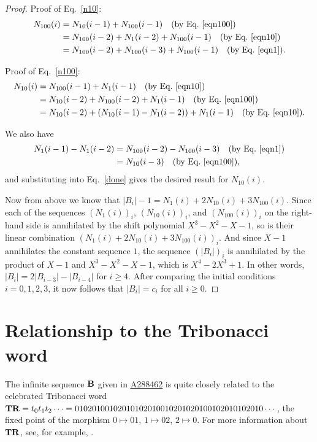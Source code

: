 \documentclass[
final
]{dmtcs-episciences}
\newcommand{\seqnum}[1]{\href{https://oeis.org/#1}{\rm \underline{#1}}}
\theoremstyle{plain}
\theoremstyle{definition}
\theoremstyle{remark}
\begin{document}
\begin{proof}
Proof of Eq.~\eqref{n10}:
\begin{align*}
N_{100} (i) &= N_{10} (i-1) + N_{100} (i-1) \quad \text{(by Eq.~\eqref{eqn100})} \\
&= N_{100} (i-2) + N_1 (i-2) + N_{100} (i-1) \quad \text{(by Eq.~\eqref{eqn10})} \\
&= N_{100} (i-2) + N_{100} (i-3) + N_{100} (i-1) \quad \text{(by Eq.~\eqref{eqn1})}.
\end{align*}

Proof of Eq.~\eqref{n100}:
\begin{align}
N_{10} (i) &= N_{100} (i-1) + N_1 (i-1) \quad \text{(by Eq.~\eqref{eqn10})}  \nonumber\\
&= N_{10} (i-2) + N_{100} (i-2) + N_1(i-1) \quad \text{(by Eq.~\eqref{eqn100})} \nonumber \\
&= N_{10} (i-2) + (N_{10} (i-1) - N_1 (i-2)) + N_1 (i-1) \quad \text{(by Eq.~\eqref{eqn10})} \label{done} .
\end{align}

We also have
\begin{align*}
N_1(i-1) - N_1 (i-2) &= N_{100} (i-2) - N_{100} (i-3) \quad \text{(by Eq.~\eqref{eqn1})} \\
&= N_{10} (i-3) \quad \text{(by Eq.~\eqref{eqn100})},
\end{align*}
and substituting into Eq.~\eqref{done} gives the desired result for $N_{10} (i)$.

Now from above we know that $|B_i| - 1 = N_1 (i) + 2 N_{10} (i) + 3 N_{100} (i)$.  Since each of the
sequences $(N_1 (i))_i$, $(N_{10} (i))_i$, and $(N_{100} (i))_i$ 
on the right-hand side is annihilated by the shift polynomial $X^3 - X^2 - X - 1$, so is their linear
combination  $(N_1 (i) + 2 N_{10} (i) + 3 N_{100} (i))_i$.  And since $X-1$ annihilates the
constant sequence $1$, the sequence $(|B_i|)_i$ is annihilated by the product of
$X-1$ and $X^3 - X^2 - X - 1$, which is $X^4 - 2X^3 + 1$.   In other words,
$|B_{i}| = 2|B_{i-3}| - |B_{i-4}|$ for $i \geq 4$.  After comparing the initial conditions
$i = 0,1,2,3$, it now follows that
$|B_i| = c_i$ for all $i \geq 0$.
\end{proof}



\section{Relationship to the Tribonacci word}

The infinite sequence $\bf B$ given in \seqnum{A288462} is
quite closely related to the celebrated Tribonacci word
${\bf TR} = t_0 t_1 t_2 \cdots = 01020100102010102010010201020100102010102010
\cdots$, the fixed point of the morphism $0 \mapsto 01$, $1 \mapsto 02$, $2 \mapsto 0$.  For more information about $\bf TR$,  see, for example, \cite{Chekhova&Hubert&Messaoudi:2001}.
\end{document}
